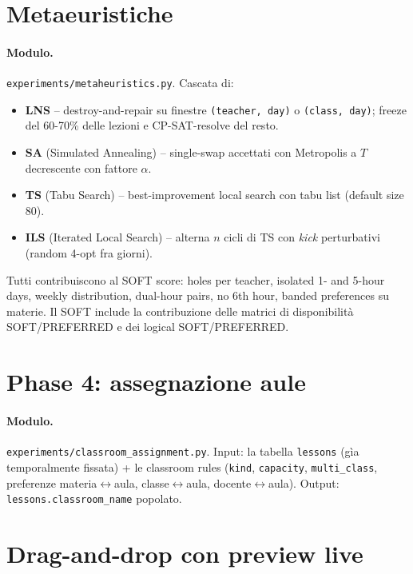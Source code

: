 \section{Metaeuristiche}

\paragraph{Modulo.} \texttt{experiments/metaheuristics.py}.
Cascata di:

\begin{itemize}
  \item \textbf{LNS} -- destroy-and-repair su finestre
        \texttt{(teacher, day)} o \texttt{(class, day)}; freeze del
        60-70\% delle lezioni e CP-SAT-resolve del resto.
  \item \textbf{SA} (Simulated Annealing) -- single-swap accettati
        con Metropolis a $T$ decrescente con fattore $\alpha$.
  \item \textbf{TS} (Tabu Search) -- best-improvement local search
        con tabu list (default size 80).
  \item \textbf{ILS} (Iterated Local Search) -- alterna $n$ cicli di
        TS con \emph{kick} perturbativi (random 4-opt fra giorni).
\end{itemize}

Tutti contribuiscono al SOFT score: holes per teacher, isolated 1-
and 5-hour days, weekly distribution, dual-hour pairs, no 6th hour,
banded preferences su materie. Il SOFT include la contribuzione delle
matrici di disponibilit\`a SOFT/PREFERRED e dei logical SOFT/PREFERRED.

\section{Phase 4: assegnazione aule}

\paragraph{Modulo.} \texttt{experiments/classroom\_assignment.py}.
Input: la tabella \texttt{lessons} (g\`ia temporalmente fissata) +
le classroom rules (\texttt{kind}, \texttt{capacity},
\texttt{multi\_class}, preferenze materia$\leftrightarrow$aula,
classe$\leftrightarrow$aula, docente$\leftrightarrow$aula).
Output: \texttt{lessons.classroom\_name} popolato.

\section{Drag-and-drop con preview live}

